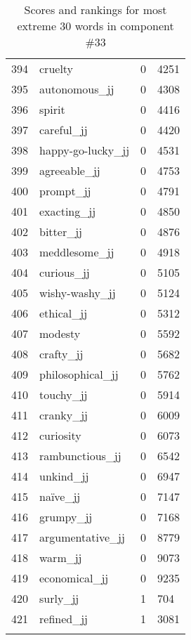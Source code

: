 \begin{longtable}[!htbp]{| rlr@{.}l |}
    394 & cruelty & 0 & 4251 \\
    395 & autonomous\_jj & 0 & 4308 \\
    396 & spirit & 0 & 4416 \\
    397 & careful\_jj & 0 & 4420 \\
    398 & happy-go-lucky\_jj & 0 & 4531 \\
    399 & agreeable\_jj & 0 & 4753 \\
    400 & prompt\_jj & 0 & 4791 \\
    401 & exacting\_jj & 0 & 4850 \\
    402 & bitter\_jj & 0 & 4876 \\
    403 & meddlesome\_jj & 0 & 4918 \\
    404 & curious\_jj & 0 & 5105 \\
    405 & wishy-washy\_jj & 0 & 5124 \\
    406 & ethical\_jj & 0 & 5312 \\
    407 & modesty & 0 & 5592 \\
    408 & crafty\_jj & 0 & 5682 \\
    409 & philosophical\_jj & 0 & 5762 \\
    410 & touchy\_jj & 0 & 5914 \\
    411 & cranky\_jj & 0 & 6009 \\
    412 & curiosity & 0 & 6073 \\
    413 & rambunctious\_jj & 0 & 6542 \\
    414 & unkind\_jj & 0 & 6947 \\
    415 & naïve\_jj & 0 & 7147 \\
    416 & grumpy\_jj & 0 & 7168 \\
    417 & argumentative\_jj & 0 & 8779 \\
    418 & warm\_jj & 0 & 9073 \\
    419 & economical\_jj & 0 & 9235 \\
    420 & surly\_jj & 1 & 704 \\
    421 & refined\_jj & 1 & 3081 \\
    \hline
    \caption{Scores and rankings for most extreme 30 words in component \#33} \\
\end{longtable}
